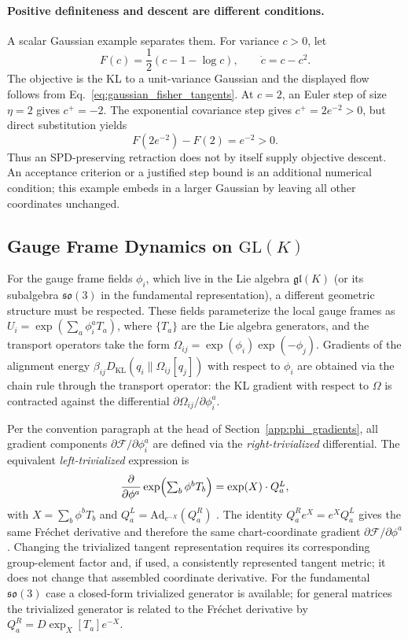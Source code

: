 \documentclass[twoside,11pt]{article}
\begin{document}
\paragraph{Positive definiteness and descent are different conditions.}
A scalar Gaussian example separates them. For variance \(c>0\), let
\begin{equation}
F(c)=\frac12(c-1-\log c),\qquad
\dot c=c-c^2.
\label{eq:scalar_fisher_descent}
\end{equation}
The objective is the KL to a unit-variance Gaussian and the displayed flow follows from Eq.~\eqref{eq:gaussian_fisher_tangents}. At \(c=2\), an Euler step of size \(\eta=2\) gives \(c^+=-2\). The exponential covariance step gives \(c^+=2e^{-2}>0\), but direct substitution yields
\begin{equation}
F(2e^{-2})-F(2)=e^{-2}>0.
\label{eq:spd_not_descent}
\end{equation}
Thus an SPD-preserving retraction does not by itself supply objective descent. An acceptance criterion or a justified step bound is an additional numerical condition; this example embeds in a larger Gaussian by leaving all other coordinates unchanged.

\subsection{Gauge Frame Dynamics on $\mathrm{GL}(K)$}
For the gauge frame fields $\phi_i$, which live in the Lie algebra $\mathfrak{gl}(K)$ (or its subalgebra $\mathfrak{so}(3)$ in the fundamental representation), a different geometric structure must be respected. These fields parameterize the local gauge frames as $U_i = \exp(\sum_a \phi_i^a T_a)$, where $\{T_a\}$ are the Lie algebra generators, and the transport operators take the form $\Omega_{ij} = \exp(\phi_i)\exp(-\phi_j)$. Gradients of the alignment energy $\beta_{ij} D_{\mathrm{KL}}(q_i \| \Omega_{ij}[q_j])$ with respect to $\phi_i$ are obtained via the chain rule through the transport operator: the KL gradient with respect to $\Omega$ is contracted against the differential $\partial\Omega_{ij}/\partial\phi_i^a$.

Per the convention paragraph at the head of Section~\ref{app:phi_gradients}, all gradient components $\partial \mathcal{F}/\partial \phi_i^a$ are defined via the \emph{right-trivialized} differential. The equivalent \emph{left-trivialized} expression is
\begin{equation}
\frac{\partial}{\partial \phi^a}\exp \Bigl(\textstyle\sum_b \phi^b T_b\Bigr) = \exp(X)\cdot Q_a^{L},
\end{equation}
with $X=\sum_b\phi^bT_b$ and $Q_a^L=\mathrm{Ad}_{e^{-X}}(Q_a^R)$ \citep{Hall2015}. The identity $Q_a^Re^X=e^XQ_a^L$ gives the same Fr\'echet derivative and therefore the same chart-coordinate gradient $\partial\mathcal F/\partial\phi^a$. Changing the trivialized tangent representation requires its corresponding group-element factor and, if used, a consistently represented tangent metric; it does not change that assembled coordinate derivative. For the fundamental $\mathfrak{so}(3)$ case a closed-form trivialized generator is available; for general matrices the trivialized generator is related to the Fr\'echet derivative by $Q_a^R=D\exp_X[T_a]e^{-X}$.
\end{document}
